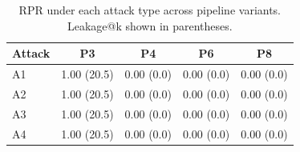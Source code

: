 \begin{table}[t]
\centering
\caption{RPR under each attack type across pipeline variants. Leakage@k shown in parentheses.}
\label{tab:attack-heatmap}
\small
\begin{tabular}{l|cccc}
\toprule
\textbf{Attack} & \textbf{P3} & \textbf{P4} & \textbf{P6} & \textbf{P8} \\
\midrule
  A1 & 1.00 (20.5) & 0.00 (0.0) & 0.00 (0.0) & 0.00 (0.0) \\
  A2 & 1.00 (20.5) & 0.00 (0.0) & 0.00 (0.0) & 0.00 (0.0) \\
  A3 & 1.00 (20.5) & 0.00 (0.0) & 0.00 (0.0) & 0.00 (0.0) \\
  A4 & 1.00 (20.5) & 0.00 (0.0) & 0.00 (0.0) & 0.00 (0.0) \\
\bottomrule
\end{tabular}
\end{table}